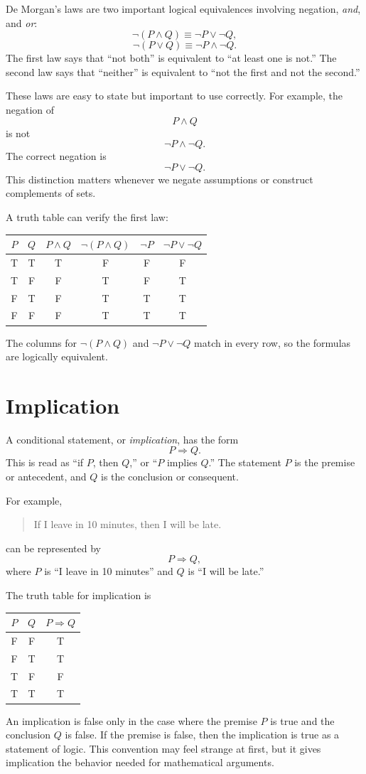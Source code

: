 De Morgan's laws are two important logical equivalences involving negation, \emph{and}, and \emph{or}:
\[
\neg(P \land Q) \equiv \neg P \lor \neg Q,
\]
\[
\neg(P \lor Q) \equiv \neg P \land \neg Q.
\]
The first law says that ``not both'' is equivalent to ``at least one is not.'' The second law says that ``neither'' is equivalent to ``not the first and not the second.''

These laws are easy to state but important to use correctly. For example, the negation of
\[
P \land Q
\]
is not
\[
\neg P \land \neg Q.
\]
The correct negation is
\[
\neg P \lor \neg Q.
\]
This distinction matters whenever we negate assumptions or construct complements of sets.

A truth table can verify the first law:
\begin{center}
\begin{tabular}{c c c c c c}
\hline
\(P\) & \(Q\) & \(P \land Q\) & \(\neg(P \land Q)\) & \(\neg P\) & \(\neg P \lor \neg Q\) \\
\hline
T & T & T & F & F & F \\
T & F & F & T & F & T \\
F & T & F & T & T & T \\
F & F & F & T & T & T \\
\hline
\end{tabular}
\end{center}
The columns for \(\neg(P \land Q)\) and \(\neg P \lor \neg Q\) match in every row, so the formulas are logically equivalent.

\section{Implication}
\label{mf:logic-implication}

A conditional statement, or \emph{implication}, has the form
\[
P \Rightarrow Q.
\]
This is read as ``if \(P\), then \(Q\),'' or ``\(P\) implies \(Q\).'' The statement \(P\) is the premise or antecedent, and \(Q\) is the conclusion or consequent.

For example,
\begin{quote}
If I leave in 10 minutes, then I will be late.
\end{quote}
can be represented by
\[
P \Rightarrow Q,
\]
where \(P\) is ``I leave in 10 minutes'' and \(Q\) is ``I will be late.''

The truth table for implication is
\begin{center}
\begin{tabular}{c c c}
\hline
\(P\) & \(Q\) & \(P \Rightarrow Q\) \\
\hline
F & F & T \\
F & T & T \\
T & F & F \\
T & T & T \\
\hline
\end{tabular}
\end{center}
An implication is false only in the case where the premise \(P\) is true and the conclusion \(Q\) is false. If the premise is false, then the implication is true as a statement of logic. This convention may feel strange at first, but it gives implication the behavior needed for mathematical arguments.

